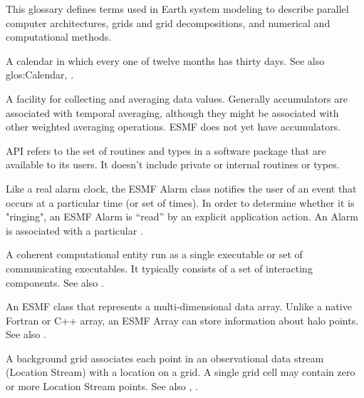 
\label{sec:glos}

This glossary defines terms used in Earth system modeling to describe 
parallel computer architectures, grids and grid decompositions, and 
numerical and computational methods.

\begin{description}

\label{glos:360DayCal}
\item[360-day calendar] A calendar in which 
  every one of twelve months has thirty days.  See also 
  {glos:Calendar}, .

\label{glos:Accumulator}
\item[Accumulator] A facility for collecting 
  and averaging data values.  Generally accumulators are associated with 
  temporal averaging, although they might be associated with 
  other weighted averaging operations.  ESMF does not yet have accumulators.

\label{glos:API}
\item[Application Programming Interface (API)] API refers to the 
  set of routines and types in a software package that are
  available to its users.  It doesn't include private or internal
  routines or types.
  
\label{glos:Alarm}
\item[Alarm] Like a real alarm clock, the ESMF Alarm class notifies
  the user of an event that occurs at a particular 
  time (or set of times).  In order to determine whether it
  is "ringing", an ESMF Alarm is ``read'' by an explicit
  application action.  An Alarm is associated
  with a particular .

\label{glos:Application}
\item[Application] A coherent computational 
  entity run as a single executable or set of communicating executables.  
  It typically consists of a set of interacting components.  
  See also .

\label{glos:Array}
\item[Array] An ESMF class that represents a multi-dimensional
  data array.  Unlike a native Fortran or C++ array, an ESMF Array
  can store information about halo points.  See also .

\label{glos:BackGrid}
\item[Background grid] 
  A background grid associates each point in an observational data stream 
  (Location Stream) with a location on a grid. A single grid cell may contain 
  zero or more Location Stream points. See also , . 


\end{description}
